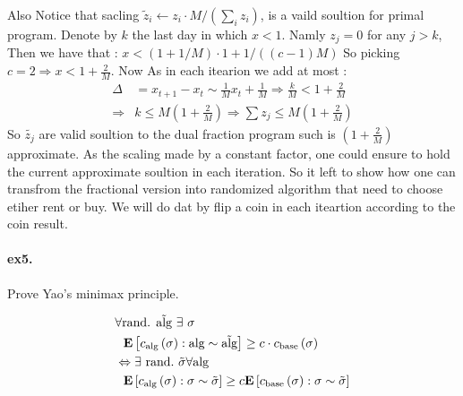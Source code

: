 \documentclass{article}
\begin{document}
\begin{multicols*}{2}
  Also Notice that sacling $\tilde{z}_{i} \leftarrow z_{i} \cdot M / \left( \sum_{i}z_{i}  \right)$, is a vaild soultion for primal program. Denote by $k$ the last day in which  $x < 1$. Namly $z_{j} = 0 $ for any $j > k$, Then we have that :  $x < \left( 1 + 1/M  \right)\cdot 1 + 1 / \left( \left( c-1 \right)M \right) $ So picking $c = 2 \Rightarrow x < 1 + \frac{2}{M}$.
  Now As in each itearion we add at most : 
  \begin{equation*}
    \begin{split}
      \Delta  & = x_{t+1} - x_{t} \sim \frac{1}{M} x_{t} + \frac{1}{M} \Rightarrow \frac{k}{M} < 1+ \frac{2}{M} \\
      \Rightarrow & k \le M\left( 1 + \frac{2}{M} \right) \Rightarrow \sum{z_{j}}\le M\left( 1 + \frac{2}{M} \right)
    \end{split}
  \end{equation*}
So $\tilde{z_{j}}$ are valid soultion to the dual fraction program such is $ \left( 1 + \frac{2}{M} \right)$ approximate. As the scaling made by a constant factor, one could ensure to hold the current approximate soultion in each iteration.   
So it left to show how one can transfrom the fractional version into randomized algorithm that need to choose etiher rent or buy. We will do dat by flip a coin in each iteartion according to the coin result.  
  \paragraph{ex5.} Prove Yao's minimax principle. 

  \begin{equation*}
    \begin{split}
      & \forall \text{rand. } \tilde{\text{alg}} \  \exists  \ \sigma  \\
      & \ \ \dalg{ \calg\left( \sigma \right) } \ge c \cdot   \cbase\left( \sigma \right) \\  
      & \Leftrightarrow \exists \ \text{rand.} \ \tilde{\sigma} \forall \text{alg} \\  
      & \ \ \dsig{  \calg\left( \sigma \right)  } \ge c \dsig{ \cbase \left( \sigma \right)  } 
    \end{split}
  \end{equation*}

\end{multicols*}
\end{document}

